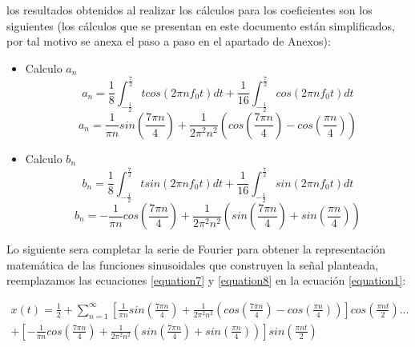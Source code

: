 \documentclass[12pt]{article}
\begin{document}
    los resultados obtenidos al realizar los cálculos para los coeficientes son los siguientes (los cálculos que 
    se presentan en este documento están simplificados, por tal motivo se anexa el paso a paso en el apartado de 
    Anexos):\\

    \begin{itemize}
        \item Calculo $a_{n}$
            \begin{equation*}
                a_{n}=\frac{1}{8}\int_{-\frac{1}{2}}^{\frac{7}{2}} tcos(2\pi nf_0t)dt + 
                \frac{1}{16} \int_{-\frac{1}{2}}^{\frac{7}{2}} cos(2\pi nf_0t)dt
            \end{equation*}
            \begin{equation}
                a_{n}=\frac{1}{\pi n} sin\left(\frac{7\pi n}{4}\right)+\frac{1}{2\pi^2 n^2}\left(cos\left(\frac{7\pi n}{4}\right)-cos\left(\frac{\pi n}{4}\right)\right)
                \label{equation7}
            \end{equation}
        \item Calculo $b_{n}$
            \begin{equation*}
                b_{n}=\frac{1}{8}\int_{-\frac{1}{2}}^{\frac{7}{2}} tsin(2\pi nf_0t)dt + 
                \frac{1}{16} \int_{-\frac{1}{2}}^{\frac{7}{2}} sin(2\pi nf_0t)dt
            \end{equation*}
            \begin{equation}
                b_{n}=-\frac{1}{\pi n} cos\left(\frac{7\pi n}{4}\right)+\frac{1}{2\pi^2 n^2}\left(sin\left(\frac{7\pi n}{4}\right)+sin\left(\frac{\pi n}{4}\right)\right)
                \label{equation8}
            \end{equation}
    \end{itemize}
    
    Lo siguiente sera completar la serie de Fourier para obtener la representación matemática de las funciones sinusoidales 
    que construyen la señal planteada, reemplazamos las ecuaciones \ref{equation7} y \ref{equation8} en la ecuación 
    \ref{equation1}:

    \begin{multline}
        x(t)=\frac{1}{2}+\sum_{n=1}^{\infty} \left[\frac{1}{\pi n} sin\left(\frac{7\pi n}{4}\right)+\frac{1}{2\pi^2 n^2}\left(cos\left(\frac{7\pi n}{4}\right)-cos\left(\frac{\pi n}{4}\right)\right)
        \right]cos\left(\frac{\pi nt}{2}\right)...\\ +\left[-\frac{1}{\pi n} cos\left(\frac{7\pi n}{4}\right)+\frac{1}{2\pi^2 n^2}\left(sin\left(\frac{7\pi n}{4}\right)+sin\left(\frac{\pi n}{4}\right)\right)
        \right]sin\left(\frac{\pi nt}{2}\right)
        \label{equation9}
    \end{multline}
\end{document}
